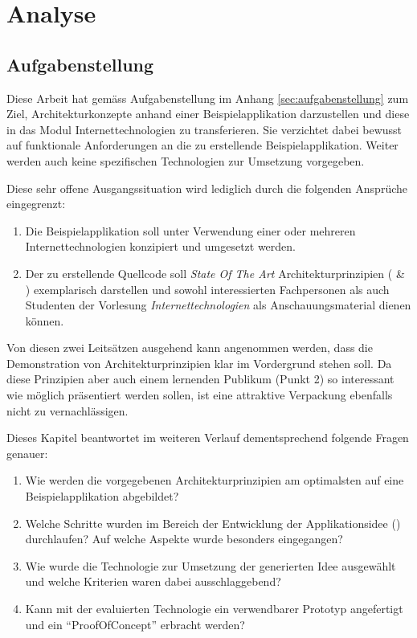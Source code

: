 \chapter{Analyse}
\label{sec:analyse}
\label{sec:analyse-der-aufgabenstellung}

\section*{Aufgabenstellung}

Diese Arbeit hat gemäss Aufgabenstellung im Anhang \ref{sec:aufgabenstellung} zum Ziel, Architekturkonzepte anhand einer Beispielapplikation darzustellen und diese in das Modul Internettechnologien zu transferieren. Sie verzichtet dabei bewusst auf funktionale Anforderungen an die zu erstellende Beispielapplikation. Weiter werden auch keine spezifischen Technologien zur Umsetzung vorgegeben.

Diese sehr offene Ausgangssituation wird lediglich durch die folgenden Ansprüche eingegrenzt:

\begin{enumerate}
	\item Die Beispielapplikation soll unter Verwendung einer oder mehreren Internettechnologien konzipiert und umgesetzt werden.
	\item Der zu erstellende Quellcode soll \emph{State Of The Art} Architekturprinzipien (\cite{ROCA} \& \cite{TilkovSlides}) exemplarisch darstellen und sowohl interessierten Fachpersonen als auch Studenten der Vorlesung \emph{Internettechnologien} als Anschauungsmaterial dienen können.
\end{enumerate}

Von diesen zwei Leitsätzen ausgehend kann angenommen werden, dass die Demonstration von Architekturprinzipien klar im Vordergrund stehen soll. Da diese Prinzipien aber auch einem lernenden Publikum (Punkt 2) so interessant wie möglich präsentiert werden sollen, ist eine attraktive Verpackung ebenfalls nicht zu vernachlässigen.

Dieses Kapitel beantwortet im weiteren Verlauf dementsprechend folgende Fragen genauer:

\begin{enumerate}
	\item Wie werden die vorgegebenen Architekturprinzipien am optimalsten auf eine Beispielapplikation abgebildet?
	\item Welche Schritte wurden im Bereich der Entwicklung der Applikationsidee () durchlaufen? Auf welche Aspekte wurde besonders eingegangen?
	\item Wie wurde die Technologie zur Umsetzung der generierten Idee ausgewählt und welche Kriterien waren dabei ausschlaggebend?
	\item Kann mit der evaluierten Technologie ein verwendbarer Prototyp angefertigt und ein ``\gls{ProofOfConcept}'' erbracht werden?
\end{enumerate}



\newpage


\newpage


\newpage

